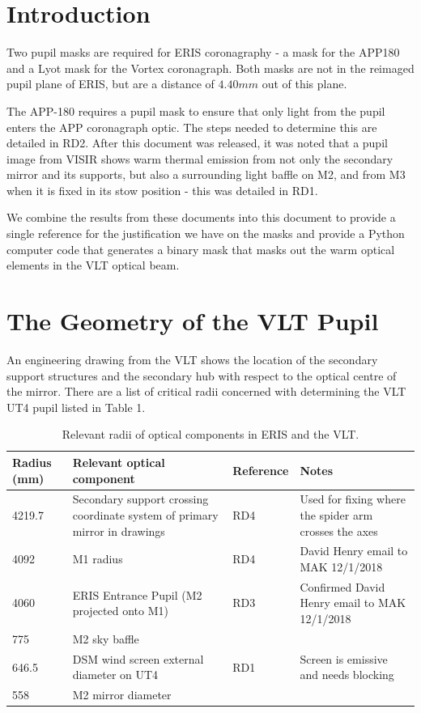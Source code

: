 \documentclass[a4paper,11pt]{article}
\begin{document}
\clearpage

\section{Introduction}
Two pupil masks are required for ERIS coronagraphy - a mask for the APP180 and
a Lyot mask for the Vortex coronagraph. Both masks are not in the reimaged
pupil plane of ERIS, but are a distance of $4.40mm$ out of this plane.

The APP-180 requires a pupil mask to ensure that only light from the pupil
enters the APP coronagraph optic. The steps needed to determine this are
detailed in RD2. After this document was released, it was noted that a pupil
image from VISIR shows warm thermal emission from not only the secondary mirror
and its supports, but also a surrounding light baffle on M2, and from M3 when
it is fixed in its stow position - this was detailed in RD1.

We combine the results from these documents into this document to provide a
single reference for the justification we have on the masks and provide a
Python computer code that generates a binary mask that masks out the warm
optical elements in the VLT optical beam.


\section{The Geometry of the VLT Pupil}

An engineering drawing from the VLT shows the location of the secondary support structures and the secondary hub with respect to the optical centre of the mirror. There are a list of critical radii concerned with determining the VLT UT4 pupil listed in Table 1.




\begin{table}[h]

\begin{tabular}{@{}p{1cm} p{7cm} l p{5cm}@{}}
\toprule
Radius (mm)& Relevant optical component & Reference & Notes \\
\midrule
4219.7 & Secondary support crossing coordinate system of primary mirror in drawings & RD4 & Used for fixing where the spider arm crosses the axes \\
4092 & M1 radius & RD4 & David Henry email to MAK 12/1/2018 \\
4060 & ERIS Entrance Pupil (M2 projected onto M1) & RD3 & Confirmed David Henry email to MAK 12/1/2018 \\
775 & M2 sky baffle & & \\
646.5 & DSM wind screen external diameter on UT4 & RD1 & Screen is emissive and needs blocking \\
558 & M2 mirror diameter & & \\
\bottomrule
\end{tabular}
\caption{ \label{tab:tablesadf} Relevant radii of optical components in ERIS and the VLT.}
\end{table}
\end{document}
